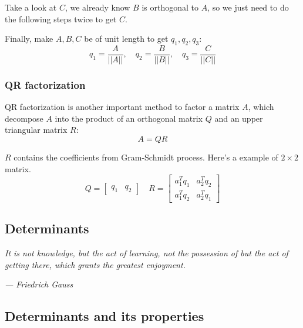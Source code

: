 \documentclass[12pt]{ctexart}
\begin{document}
Take a look at $C$, we already know $B$ is orthogonal to $A$, so we just need to do the
following steps twice to get $C$.

Finally, make $A, B, C$ be of unit length to get $q_1, q_2, q_3$:
\[
  q_1 = \frac{A}{||A||}, \quad q_2 = \frac{B}{||B||}, \quad q_3 = \frac{C}{||C||}
\]

\subsubsection{\textbf{QR factorization}}

QR factorization is another important method to factor a matrix $A$, which decompose
$A$ into the product of an orthogonal matrix $Q$ and an upper triangular matrix $R$:
\[
A = QR
\]

$R$ contains the coefficients from Gram-Schmidt process. Here's a example of $2 \times 2$
matrix.
\[
  Q = \begin{bmatrix} q_1 & q_2 \end{bmatrix} \quad
  R = \begin{bmatrix}
    a_1^{T}q_1 & a_2^{T}q_2 \\
    a_1^{T}q_2 & a_2^{T}q_1
  \end{bmatrix}
\]

\newpage
\thispagestyle{empty}
\begin{center}
    \vspace*{96pt}
    \fontsize{60}{60}\par
    \fontsize{26}{31.2}\section{\textbf{Determinants}}\par %
    \vspace{25pt}
    \begin{center}
      \fontsize{18}{21.6}\customfont\textit{It is not knowledge, but the act of learning,
      not the possession of but the act of getting there, which grants the greatest
      enjoyment.}
    \end{center}
    \begin{flushright}
      \fontsize{18}{21.6}\customfont\textit{--- Friedrich Gauss}
    \end{flushright}
    \vfill
\end{center}

\newpage
\subsection{\textbf{Determinants and its properties}}
\end{document}
